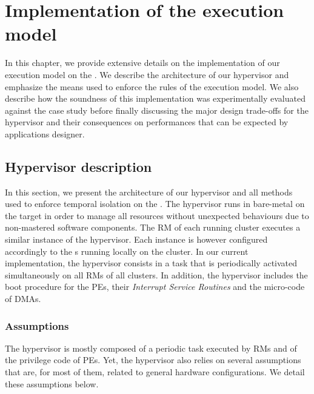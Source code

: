\documentclass[main.tex]{subfiles}
\begin{document}
\chapter{Implementation of the execution model}
\thispagestyle{chapstyle}
\label{chap_implemExecMod}
\minitoc

In this chapter, we provide extensive details on the implementation of our execution model on the \mppalong. We describe the architecture of our hypervisor and emphasize the means used to enforce the rules of the execution model. We also describe how the soundness of this implementation was experimentally evaluated against the \rosace case study before finally discussing the major design trade-offs for the hypervisor and their consequences on performances that can be expected by applications designer.

\section{Hypervisor description}
In this section, we present the architecture of our hypervisor and all methods used to enforce temporal isolation on the \mppalong. The hypervisor runs in bare-metal on the target in order to manage all resources without unexpected behaviours due to non-mastered software components. The RM of each running cluster executes a similar instance of the hypervisor. Each instance is however configured accordingly to the \PN{}s running locally on the cluster. In our current implementation, the hypervisor consists in a task that is periodically activated simultaneously on all RMs of all clusters. In addition, the hypervisor includes the boot procedure for the PEs, their \emph{Interrupt Service Routines} and the micro-code of DMAs. 

\subsection{Assumptions}
The hypervisor is mostly composed of a periodic task executed by RMs and of the privilege code of PEs. Yet, the hypervisor also relies on several assumptions that are, for most of them, related to general hardware configurations. We detail these assumptions below.
\end{document}
